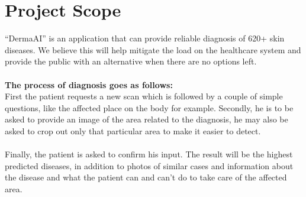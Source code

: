 \section{Project Scope }
 “DermaAI” is an application that can provide reliable diagnosis of 620+ skin 
diseases. We believe this will help mitigate the load on the healthcare system
and provide the public with an alternative when there are no options left.\\\\
\textbf{The process of diagnosis goes as follows:}\\
First the patient requests a new scan which is followed by a couple of simple 
questions, like the affected place on the body for example.
Secondly, he is to be asked to provide an image of the area related to the 
diagnosis, he may also be asked to crop out only that particular area to make it easier to detect.\\\\
Finally, the patient is asked to confirm his input. The result will be the 
highest predicted diseases, in addition to photos of similar cases and 
information about the disease and what the patient can and can’t do to take care of the affected area.\\\\
